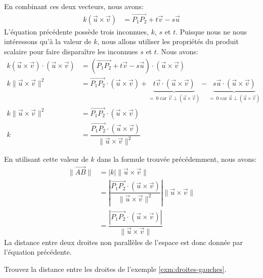 \documentclass[]{book}
\theoremstyle{definition}
\theoremstyle{definition}
\theoremstyle{definition}
\theoremstyle{remark}
\let\BeginKnitrBlock\begin \let\EndKnitrBlock\end
\begin{document}
En combinant ces deux vecteurs, nous avons:
\begin{align*}
k(\vec u \times \vec v) &= \overrightarrow{P_1P_2} +t\vec v - s\vec u
\end{align*}
L'équation précédente possède trois inconnues, \(k\), \(s\) et \(t\). Puisque nous ne nous intéressons qu'à la valeur de \(k\), nous allons utiliser les propriétés du produit scalaire pour faire disparaître les inconnues \(s\) et \(t\). Nous avons:
\begin{align*}
k(\vec u \times \vec v)\cdot(\vec u \times \vec v)  &= (\overrightarrow{P_1P_2} +t\vec v - s\vec u)\cdot(\vec u \times \vec v) \\
k\lVert\vec u \times \vec v\rVert^2 &= \overrightarrow{P_1P_2}\cdot(\vec u \times \vec v)
+\underbrace{t\vec v \cdot(\vec u \times \vec v)}_{=\ 0 \text{ car } \vec v \perp (\vec u \times \vec v)} -\underbrace{s\vec u \cdot(\vec u \times \vec v)}_{=\ 0 \text{ car } \vec u \perp (\vec u \times \vec v)} \\
k\lVert\vec u \times \vec v\rVert^2 &= \overrightarrow{P_1P_2}\cdot(\vec u \times \vec v) \\
k &= \dfrac{\overrightarrow{P_1P_2}\cdot(\vec u \times \vec v)}{\lVert\vec u \times \vec v\rVert^2}
\end{align*}

En utilisant cette valeur de \(k\) dans la formule trouvée précédemment, nous avons:
\begin{align*}
\lVert\overrightarrow{AB}\rVert &= |k| \lVert\vec u \times \vec v\rVert \\
&= \left|\dfrac{\overrightarrow{P_1P_2}\cdot(\vec u \times \vec v)}{\lVert\vec u \times \vec v\rVert^2}\right| \lVert\vec u \times \vec v\rVert \\
&= \dfrac{\left|\overrightarrow{P_1P_2}\cdot(\vec u \times \vec v)\right|}{\lVert\vec u \times \vec v\rVert}
\end{align*}
La distance entre deux droites non parallèles de l'espace est donc donnée par l'équation précédente.

\BeginKnitrBlock{example}
\protect\hypertarget{exm:unnamed-chunk-214}{}{\label{exm:unnamed-chunk-214} }Trouvez la distance entre les droites de l'exemple \ref{exm:droites-gauches}.
\EndKnitrBlock{example}
\end{document}
